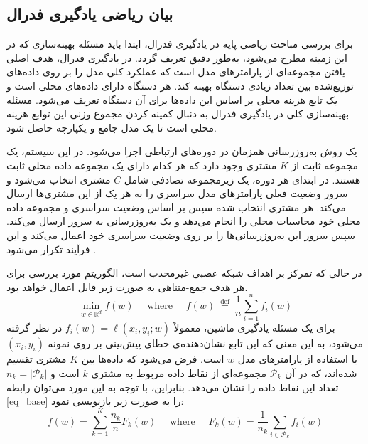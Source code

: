 \subsection{بیان ریاضی یادگیری فدرال}
برای بررسی مباحث ریاضی پایه در یادگیری فدرال، ابتدا باید مسئله بهینه‌سازی که در این زمینه مطرح می‌شود، به‌طور دقیق تعریف گردد. در یادگیری فدرال، هدف اصلی یافتن مجموعه‌ای از پارامترهای مدل است که عملکرد کلی مدل را بر روی داده‌های توزیع‌شده بین تعداد زیادی دستگاه بهینه کند. هر دستگاه دارای داده‌های محلی است و یک تابع هزینه محلی بر اساس این داده‌ها برای آن دستگاه تعریف می‌شود. مسئله بهینه‌سازی کلی در یادگیری فدرال به دنبال کمینه کردن مجموع وزنی این توابع هزینه محلی است تا یک مدل جامع و یکپارچه حاصل شود.

یک روش به‌روزرسانی همزمان در دوره‌های ارتباطی اجرا می‌شود. در این سیستم، یک مجموعه ثابت از
$K$
مشتری وجود دارد که هر کدام دارای یک مجموعه داده محلی ثابت هستند. در ابتدای هر دوره، یک زیرمجموعه تصادفی شامل
$C$
مشتری‌ انتخاب می‌شود و سرور وضعیت فعلی پارامترهای مدل سراسری را به هر یک از این مشتری‌ها ارسال می‌کند. هر مشتری انتخاب ‌شده سپس بر اساس وضعیت سراسری و مجموعه داده محلی خود محاسبات محلی را انجام می‌دهد و یک به‌روزرسانی به سرور ارسال می‌کند. سپس سرور این به‌روزرسانی‌ها را بر روی وضعیت سراسری خود اعمال می‌کند و این فرآیند تکرار می‌شود
\cite{mcmahan2017communication}.

در حالی که تمرکز بر اهداف شبکه عصبی غیرمحدب%
است، الگوریتم مورد بررسی برای هر هدف جمع-متناهی%
به صورت زیر قابل اعمال خواهد بود.
\begin{equation}
	\min _{w \in \mathbb{R}^d} f(w) \quad \text { where } \quad f(w) \stackrel{\text { def }}{=} \frac{1}{n} \sum_{i=1}^n f_i(w)
	\label{eq_base}
\end{equation}
برای یک مسئله یادگیری ماشین، معمولاً
$f_i(w)=\ell\left(x_i, y_i ; w\right)$
در نظر گرفته می‌شود، به این معنی که این تابع نشان‌دهنده‌ی خطای پیش‌بینی بر روی نمونه
$(x_i, y_i)$
با استفاده از پارامترهای مدل
$w$
است. فرض می‌شود که داده‌ها بین
$K$
مشتری تقسیم شده‌اند، که در آن
$\mathcal{P}_k$
مجموعه‌ای از نقاط داده مربوط به مشتری
$k$
است و
$n_k=\left|\mathcal{P}_k\right|$
تعداد این نقاط داده را نشان می‌دهد. بنابراین، با توجه به این مورد می‌توان رابطه
\eqref{eq_base}
را به صورت زیر بازنویسی نمود:
\begin{equation}
	f(w)=\sum_{k=1}^K \frac{n_k}{n} F_k(w) \quad \text { where } \quad F_k(w)=\frac{1}{n_k} \sum_{i \in \mathcal{P}_k} f_i(w)
\end{equation}

